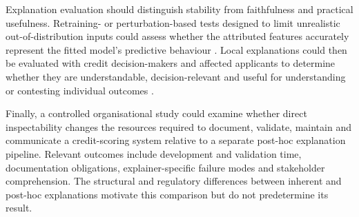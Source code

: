 Explanation evaluation should distinguish stability from faithfulness and practical
usefulness. Retraining- or perturbation-based tests designed to limit unrealistic
out-of-distribution inputs could assess whether the attributed features accurately
represent the fitted model's predictive behaviour
\citep{zhengFFidelityRobustFramework2025}. Local explanations could then be evaluated
with credit decision-makers and affected applicants to determine whether they are
understandable, decision-relevant and useful for understanding or contesting individual
outcomes \citep{nautaAnecdotalEvidenceQuantitative2023}.

Finally, a controlled organisational study could examine whether direct inspectability
changes the resources required to document, validate, maintain and communicate a
credit-scoring system relative to a separate post-hoc explanation pipeline. Relevant
outcomes include development and validation time, documentation obligations,
explainer-specific failure modes and stakeholder comprehension. The structural and
regulatory differences between inherent and post-hoc explanations motivate this
comparison but do not predetermine its result.

